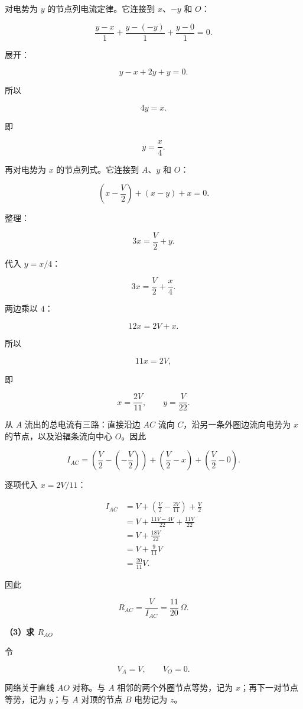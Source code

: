 \documentclass[12pt,a4paper,UTF8]{ctexart}
\begin{document}
对电势为 \(y\) 的节点列电流定律。它连接到 \(x\)、\(-y\) 和 \(O\)：

\[\frac{y-x}{1}
+\frac{y-(-y)}{1}
+\frac{y-0}{1}=0.\]

展开：

\[y-x+2y+y=0.\]

所以

\[4y=x.\]

即

\[y=\frac x4.\]

再对电势为 \(x\) 的节点列式。它连接到 \(A\)、\(y\) 和 \(O\)：

\[\left(x-\frac V2\right)+(x-y)+x=0.\]

整理：

\[3x=\frac V2+y.\]

代入 \(y=x/4\)：

\[3x=\frac V2+\frac x4.\]

两边乘以 \(4\)：

\[12x=2V+x.\]

所以

\[11x=2V,\]

即

\[x=\frac{2V}{11},\qquad
y=\frac{V}{22}.\]

从 \(A\) 流出的总电流有三路：直接沿边 \(AC\) 流向
\(C\)，沿另一条外圈边流向电势为 \(x\) 的节点，以及沿辐条流向中心
\(O\)。因此

\[I_{AC}
=\left(\frac V2-\left(-\frac V2\right)\right)
+\left(\frac V2-x\right)
+\left(\frac V2-0\right).\]

逐项代入 \(x=2V/11\)：

\[\begin{aligned}
I_{AC}
&=V+\left(\frac V2-\frac{2V}{11}\right)+\frac V2\\
&=V+\frac{11V-4V}{22}+\frac{11V}{22}\\
&=V+\frac{18V}{22}\\
&=V+\frac9{11}V\\
&=\frac{20}{11}V.
\end{aligned}\]

因此

\[\boxed{
R_{AC}
=\frac{V}{I_{AC}}
=\frac{11}{20}\,\Omega
}.\]

\textbf{（3）求 \(R_{AO}\)}

令

\[V_A=V,\qquad V_O=0.\]

网络关于直线 \(AO\) 对称。与 \(A\) 相邻的两个外圈节点等势，记为
\(x\)；再下一对节点等势，记为 \(y\)；与 \(A\) 对顶的节点 \(B\) 电势记为
\(z\)。
\end{document}
